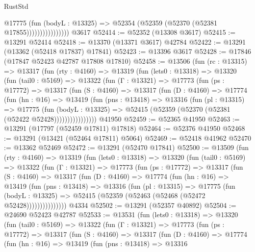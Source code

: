 \begin{lexlean}{RustStd}
\begin{coremodule}
                          @17775
                            (fun (bodyL : @13325) =>
                            @52354 (@52359 (@52370 (@52381 @17855))))))))))))))))
    @3617
@52414 := @52352 (@13308 @3617)
@52415 := @13291 @52414
@52418 := @13370 (@13371 @3617) @42784
@52422 := @13291 (@13362 (@52418 @17837) @17841)
@52423 := @13396 @3617
@52428 := @17846 (@17847 @52423 @42787 @17808 @17810)
@52458 := @13506
    (fun (rc : @13315) =>
    @13317
      (fun (rty : @4160) =>
      @13319
        (fun (lets0 : @13318) =>
        @13320
          (fun (tail0 : @5169) =>
          @13322
            (fun (Γ : @13321) =>
            @17773
              (fun (ps : @17772) =>
              @13317
                (fun (S : @4160) =>
                @13317
                  (fun (D : @4160) =>
                  @17774
                    (fun (hn : @16) =>
                    @13419
                      (fun (pns : @13418) =>
                      @13316
                        (fun (pl : @13315) =>
                        @17775
                          (fun (bodyL : @13325) =>
                          @52415 (@52359 (@52370 (@52381 (@52422 @52428))))))))))))))))
    @41950
@52459 := @52365 @41950
@52463 := @13291 (@17797 (@52459 @17811) @17818)
@52464 := @52376 @41950
@52468 := @13291 (@13421 (@52464 @17811) @5064)
@52469 := @52418 @41962
@52470 := @13362 @52469
@52472 := @13291 (@52470 @17841)
@52500 := @13509
    (fun (rty : @4160) =>
    @13319
      (fun (lets0 : @13318) =>
      @13320
        (fun (tail0 : @5169) =>
        @13322
          (fun (Γ : @13321) =>
          @17773
            (fun (ps : @17772) =>
            @13317
              (fun (S : @4160) =>
              @13317
                (fun (D : @4160) =>
                @17774
                  (fun (hn : @16) =>
                  @13419
                    (fun (pns : @13418) =>
                    @13316
                      (fun (pl : @13315) =>
                      @17775
                        (fun (bodyL : @13325) =>
                        @52415 (@52359 (@52463 (@52468 (@52472 @52428)))))))))))))))
    @4334
@52502 := @13291 (@52357 @40892)
@52504 := @24690 @52423 @42787
@52533 := @13531
    (fun (lets0 : @13318) =>
    @13320
      (fun (tail0 : @5169) =>
      @13322
        (fun (Γ : @13321) =>
        @17773
          (fun (ps : @17772) =>
          @13317
            (fun (S : @4160) =>
            @13317
              (fun (D : @4160) =>
              @17774
                (fun (hn : @16) =>
                @13419
                  (fun (pns : @13418) =>
                  @13316

\end{coremodule}
\end{lexlean}
